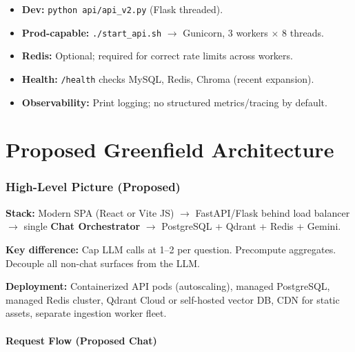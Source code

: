 \documentclass[11pt,a4paper]{article}
\newcommand{\proposed}[1]{\colorbox{proposedbg}{\parbox{\dimexpr\linewidth-2\fboxsep}{#1}}}
\begin{document}
\begin{itemize}
  \item \textbf{Dev:} \texttt{python api/api\_v2.py} (Flask threaded).
  \item \textbf{Prod-capable:} \texttt{./start\_api.sh} $\rightarrow$ Gunicorn, 3 workers $\times$ 8 threads.
  \item \textbf{Redis:} Optional; required for correct rate limits across workers.
  \item \textbf{Health:} \texttt{/health} checks MySQL, Redis, Chroma (recent expansion).
  \item \textbf{Observability:} Print logging; no structured metrics/tracing by default.
\end{itemize}

\part{Proposed Greenfield Architecture}

\section{High-Level Picture (Proposed)}

\proposed{
\textbf{Stack:} Modern SPA (React or Vite JS) $\rightarrow$ FastAPI/Flask behind load balancer $\rightarrow$ single \textbf{Chat Orchestrator} $\rightarrow$ PostgreSQL + Qdrant + Redis + Gemini.

\textbf{Key difference:} Cap LLM calls at 1--2 per question. Precompute aggregates. Decouple all non-chat surfaces from the LLM.

\textbf{Deployment:} Containerized API pods (autoscaling), managed PostgreSQL, managed Redis cluster, Qdrant Cloud or self-hosted vector DB, CDN for static assets, separate ingestion worker fleet.
}

\subsection{Request Flow (Proposed Chat)}
\end{document}
